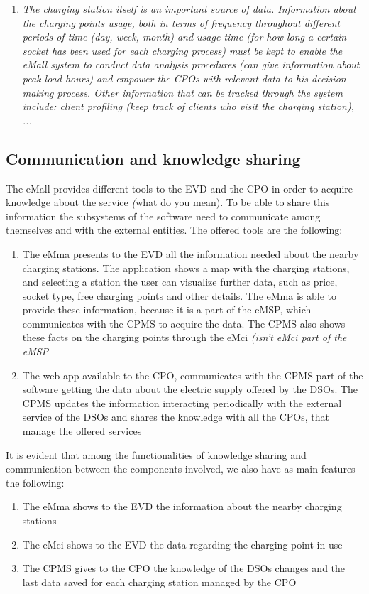 \begin{enumerate}
    \item\textit{The charging station itself is an important source of data. Information about the charging points usage, both in terms of frequency throughout different periods of time (day, week, month) and usage time (for how long a certain socket has been used for each charging process) must be kept to enable the eMall system to conduct data analysis procedures (can give information about peak load hours) and empower the CPOs with relevant data to his decision making process. Other information that can be tracked through the system include: client profiling (keep track of clients who visit the charging station), ...  }
\end{enumerate}

\subsection{Communication and knowledge sharing}
The eMall provides different tools to the EVD and the CPO in order to acquire knowledge about the service \textit(what do you mean). To be able to share this information the subsystems of the software need to communicate among themselves and with the external entities. The offered tools are the following:
\begin{enumerate}
    \item The eMma presents to the EVD all the information needed about the nearby charging stations. The application shows a map with the charging stations, and selecting a station the user can visualize further data, such as price, socket type, free charging points and other details. The eMma is able to provide these information, because it is a part of the eMSP, which communicates with the CPMS to acquire the data. The CPMS also shows these facts on the charging points through the eMci \textit{(isn't eMci part of the eMSP}
    \item The web app available to the CPO, communicates with the CPMS part of the software getting the data about the electric supply offered by the DSOs. The CPMS updates the information interacting periodically with the external service of the DSOs and shares the knowledge with all the CPOs, that manage the offered services
\end{enumerate}
It is evident that among the functionalities of knowledge sharing and communication between the components involved, we also have as main features the following:
\begin{enumerate}
    \item The eMma shows to the EVD the information about the nearby charging stations
    \item The eMci shows to the EVD the data regarding the charging point in use
    \item The CPMS gives to the CPO the knowledge of the DSOs changes and the last data saved for each charging station managed by the CPO
\end{enumerate}

